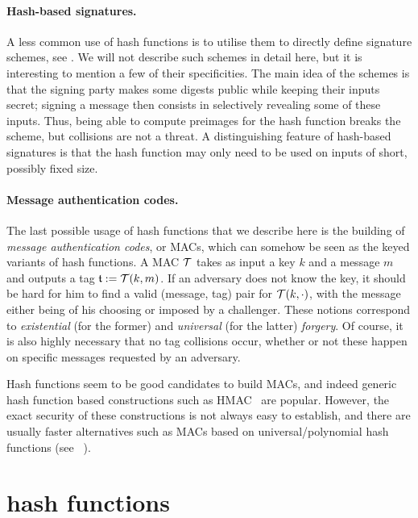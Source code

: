 \paragraph{Hash-based signatures.} A less common use of hash functions is to utilise them to directly define signature schemes, see \eg \cite{DBLP:conf/crypto/Merkle87}. We will not describe such schemes in detail
here, but it is interesting to mention a few of their specificities.
The main
idea of the schemes is that the signing party makes some digests public while keeping their inputs secret; signing a message then consists in selectively revealing some of
these inputs. Thus, being able to compute preimages for the hash function breaks the scheme, but collisions are not a threat.
A distinguishing feature of hash-based signatures is that the hash function may only need to be used on inputs of short, possibly fixed size.

\paragraph{Message authentication codes.} The last possible usage of hash functions that we describe here is the building of \emph{message authentication codes}, or MACs, which
can somehow be seen as the keyed variants of hash functions. A MAC $\operatorname{\mathcal{T}}$ takes as input a key $k$ and a message $m$ and outputs a tag $\mathfrak{t} := \operatorname{\mathcal{T}}(k, m)$.
If an adversary does not know the key, it should be hard for him to find a valid (message, tag) pair for $\operatorname{\mathcal{T}}(k, \cdot)$, with the message either being of his choosing
or imposed by a challenger. These notions correspond to \emph{existential} (for the former) and \emph{universal} (for the latter) \emph{forgery}. Of course, it is also
highly necessary that no tag collisions occur, whether or not these happen on specific messages requested by an adversary.

Hash functions seem to be good candidates to build MACs, and indeed generic hash function based constructions such as HMAC~\cite{DBLP:conf/crypto/BellareCK96} are popular. However, the exact security of
these constructions is not always easy to establish, and there are usually faster alternatives such as MACs based on universal/polynomial hash functions (see \eg~\cite{DBLP:conf/crypto/BlackHKKR99}).

\section{\merkdam hash functions}
\label{sec:mdhf}

